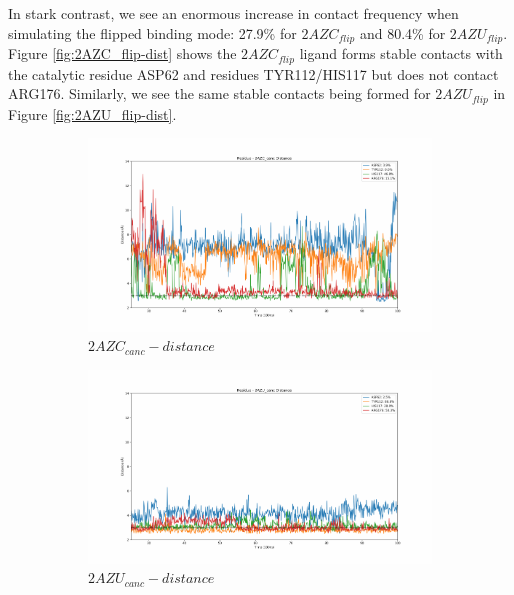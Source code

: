 In stark contrast, we see an enormous increase in contact frequency when simulating the flipped binding mode: 27.9\% for $2AZC_{flip}$ and 80.4\% for $2AZU_{flip}$.
Figure \ref{fig:2AZC_flip-dist} shows the $2AZC_{flip}$ ligand forms stable contacts with the catalytic residue ASP62 and residues TYR112/HIS117 but does not contact ARG176.
Similarly, we see the same stable contacts being formed for $2AZU_{flip}$ in Figure \ref{fig:2AZU_flip-dist}.

\begin{figure}[!ht]
\centering
   \begin{subfigure}{.45\textwidth}
     \centering
     \includegraphics[width=.95\linewidth]{chapter4/2AZC_canc/2AZC_canc-dist_3.pdf}
     \caption{$2AZC_{canc}-distance$}
     \label{fig:2AZC_canc-dist}
   \end{subfigure}
   \begin{subfigure}{.45\textwidth}
     \centering
     \includegraphics[width=.95\linewidth]{chapter4/2AZU_canc/2AZU_canc-dist_4.pdf}
     \caption{$2AZU_{canc}-distance$}
     \label{fig:2AZU_canc-dist}
   \end{subfigure}
   \\
   \begin{subfigure}{.45\textwidth}

\end{subfigure}
\end{figure}
